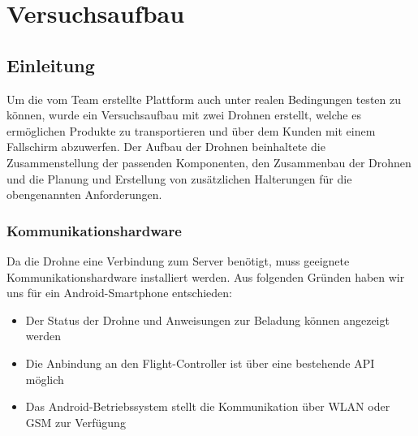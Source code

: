 \chapter{Versuchsaufbau}

\section{Einleitung}

Um die vom Team erstellte Plattform auch unter realen Bedingungen testen zu können, wurde ein Versuchsaufbau mit zwei Drohnen erstellt, welche es ermöglichen Produkte zu transportieren und über dem Kunden mit einem Fallschirm abzuwerfen. Der Aufbau der Drohnen beinhaltete die Zusammenstellung der passenden Komponenten, den Zusammenbau der Drohnen und die Planung und Erstellung von zusätzlichen Halterungen für die obengenannten Anforderungen.\\

\subsection{Kommunikationshardware}
\label{sec:communication-hardware}
Da die Drohne eine Verbindung zum Server benötigt, muss geeignete Kommunikationshardware installiert werden. Aus folgenden Gründen haben wir uns für ein Android-Smartphone entschieden:
\begin{itemize}
	\item{Der Status der Drohne und Anweisungen zur Beladung können angezeigt werden}
	\item{Die Anbindung an den Flight-Controller ist über eine bestehende API möglich}
	\item{Das Android-Betriebssystem stellt die Kommunikation über WLAN oder GSM zur Verfügung}
\end{itemize}

